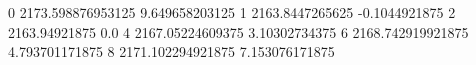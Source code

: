 0 2173.598876953125 9.649658203125
1 2163.8447265625 -0.1044921875
2 2163.94921875 0.0
4 2167.05224609375 3.10302734375
6 2168.742919921875 4.793701171875
8 2171.102294921875 7.153076171875
